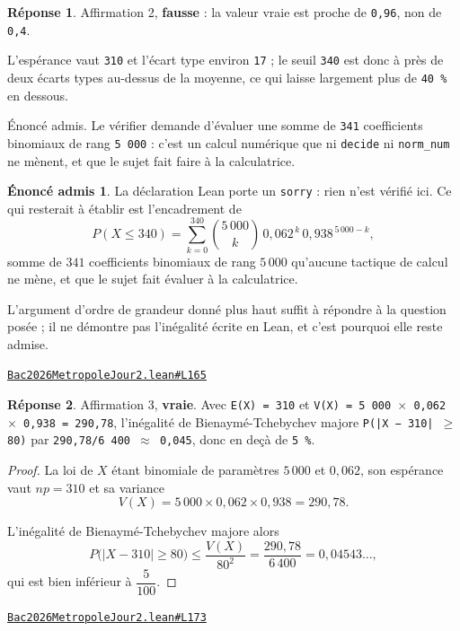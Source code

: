 \documentclass[11pt,a4paper]{article}
\theoremstyle{definition}
\theoremstyle{plain}
\theoremstyle{definition}
\newtheorem*{reponse}{Réponse}
\newtheorem*{enonceadmis}{Énoncé admis}
\newcommand{\source}[2]{\par\smallskip\noindent\hfill{\footnotesize\href{#1}{\texttt{#2}}}\par\smallskip}
\begin{document}
\begin{reponse}
Affirmation 2, \textbf{fausse} : la valeur vraie est proche de \texttt{0,96}, non de \texttt{0,4}.

L'espérance vaut \texttt{310} et l'écart type environ \texttt{17} ; le seuil \texttt{340} est donc à près de
deux écarts types au-dessus de la moyenne, ce qui laisse largement plus de \texttt{40 \%} en
dessous.

Énoncé admis. Le vérifier demande d'évaluer une somme de \texttt{341} coefficients binomiaux
de rang \texttt{5 000} : c'est un calcul numérique que ni \texttt{decide} ni \texttt{norm\_num} ne mènent, et
que le sujet fait faire à la calculatrice.
\end{reponse}
\begin{enonceadmis}
La déclaration Lean porte un \texttt{sorry} : rien n'est vérifié ici. Ce qui resterait à
établir est l'encadrement de
\[ P(X \le 340) = \sum_{k=0}^{340} \binom{5\,000}{k}\,0{,}062^{\,k}\,0{,}938^{\,5\,000-k} , \]
somme de $341$ coefficients binomiaux de rang $5\,000$ qu'aucune tactique de calcul ne
mène, et que le sujet fait évaluer à la calculatrice.

L'argument d'ordre de grandeur donné plus haut suffit à répondre à la question posée ; il
ne démontre pas l'inégalité écrite en Lean, et c'est pourquoi elle reste admise.
\end{enonceadmis}
\source{https://github.com/Commutator-IO/learn-lean/blob/main/exams/2026/Bac2026MetropoleJour2.lean\#L165}{Bac2026MetropoleJour2.lean\#L165}

\begin{reponse}
Affirmation 3, \textbf{vraie}. Avec \texttt{E(X) = 310} et
\texttt{V(X) = 5 000 \(\times\) 0,062 \(\times\) 0,938 = 290,78}, l'inégalité de Bienaymé-Tchebychev majore
\texttt{P(|X − 310| \(\ge\) 80)} par \texttt{290,78/6 400 \(\approx\) 0,045}, donc en deçà de \texttt{5 \%}.
\end{reponse}
\begin{proof}
La loi de $X$ étant binomiale de paramètres $5\,000$ et $0{,}062$, son espérance vaut
$np = 310$ et sa variance
\[ V(X) = 5\,000 \times 0{,}062 \times 0{,}938 = 290{,}78 . \]

L'inégalité de Bienaymé-Tchebychev majore alors
\[ P\bigl(|X - 310| \ge 80\bigr) \le \frac{V(X)}{80^2} = \frac{290{,}78}{6\,400}
   = 0{,}04543\ldots , \]
qui est bien inférieur à $\dfrac{5}{100}$.
\end{proof}
\source{https://github.com/Commutator-IO/learn-lean/blob/main/exams/2026/Bac2026MetropoleJour2.lean\#L173}{Bac2026MetropoleJour2.lean\#L173}
\end{document}
